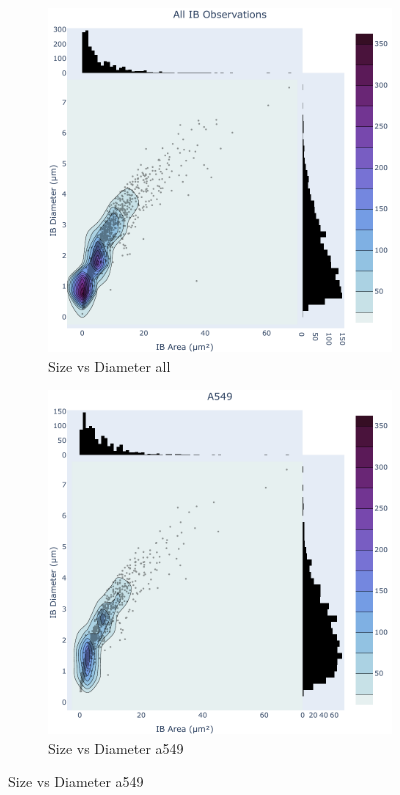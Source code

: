 \begin{figure}
    \begin{subfigure}{0.5\textwidth}
        \includegraphics[width=\textwidth]{09. Chapter 4/Figs/01. Localisation introduction/02. heatmap_all.pdf} 
        \caption[]{Size vs Diameter all}
    \end{subfigure}
    \hfill
    \begin{subfigure}{0.5\textwidth}
        \includegraphics[width=\textwidth]{09. Chapter 4/Figs/01. Localisation introduction/03. heatmap_a549.pdf}
        \caption[]{Size vs Diameter a549}
    \end{subfigure}


\end{figure}
